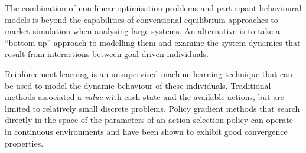 The combination of non-linear optimisation problems and participant behavioural
models is beyond the capabilities of conventional equilibrium approaches to
market simulation when analysing large systems.  An alternative is to take a
``bottom-up'' approach to modelling them and examine the system dynamics that
result from interactions between goal driven individuals.

Reinforcement learning is an unsupervised machine learning technique that can
be used to model the dynamic behaviour of these individuals.  Traditional
methods associated a \textit{value} with each state and the available actions,
but are limited to relatively small discrete problems.  Policy gradient
methods that search directly in the space of the parameters of an action selection
policy can operate in continuous environments and have been shown to
exhibit good convergence properties.
